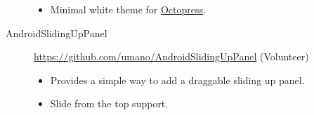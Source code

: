 \documentclass[a4paper,10pt]{article}
\begin{document}
\begin{description}
    \begin{itemize}
      \item Minimal white theme for \href{http://octopress.org}{Octopress}.
    \end{itemize}
  \item[AndroidSlidingUpPanel] \url{https://github.com/umano/AndroidSlidingUpPanel} (Volunteer)
    \begin{itemize}
      \item Provides a simple way to add a draggable sliding up panel.
      \item Slide from the top support.
    \end{itemize}
\end{description}


\end{document}
